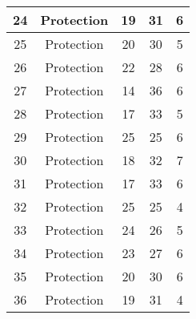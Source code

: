\documentclass[results.tex]{subfiles}
\begin{document}
\begin{center}
\begin{tabular}{| c || c | c | c | c |}
            \hline
            24                      & Protection                   & 19                     & 31                      & 6                    \\
            \hline
            25                      & Protection                   & 20                     & 30                      & 5                    \\
            \hline
            26                      & Protection                   & 22                     & 28                      & 6                    \\
            \hline
            27                      & Protection                   & 14                     & 36                      & 6                    \\
            \hline
            28                      & Protection                   & 17                     & 33                      & 5                    \\
            \hline
            29                      & Protection                   & 25                     & 25                      & 6                    \\
            \hline
            30                      & Protection                   & 18                     & 32                      & 7                    \\
            \hline
            31                      & Protection                   & 17                     & 33                      & 6                    \\
            \hline
            32                      & Protection                   & 25                     & 25                      & 4                    \\
            \hline
            33                      & Protection                   & 24                     & 26                      & 5                    \\
            \hline
            34                      & Protection                   & 23                     & 27                      & 6                    \\
            \hline
            35                      & Protection                   & 20                     & 30                      & 6                    \\
            \hline
            36                      & Protection                   & 19                     & 31                      & 4                    \\

\end{tabular}
\end{center}
\end{document}
